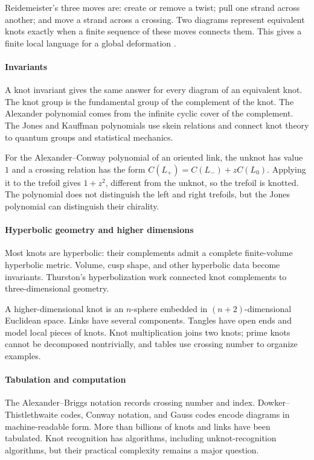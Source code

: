 Reidemeister's three moves are: create or remove a twist; pull one strand across another; and move a strand across a crossing. Two diagrams represent equivalent knots exactly when a finite sequence of these moves connects them. This gives a finite local language for a global deformation \cite{knot_theory_ref2}.

\paragraph{Invariants}
A knot invariant gives the same answer for every diagram of an equivalent knot. The knot group is the fundamental group of the complement of the knot. The Alexander polynomial comes from the infinite cyclic cover of the complement. The Jones and Kauffman polynomials use skein relations and connect knot theory to quantum groups and statistical mechanics.

For the Alexander--Conway polynomial of an oriented link, the unknot has value $1$ and a crossing relation has the form $C(L_+)=C(L_-)+zC(L_0)$. Applying it to the trefoil gives $1+z^2$, different from the unknot, so the trefoil is knotted. The polynomial does not distinguish the left and right trefoils, but the Jones polynomial can distinguish their chirality.

\paragraph{Hyperbolic geometry and higher dimensions}
Most knots are hyperbolic: their complements admit a complete finite-volume hyperbolic metric. Volume, cusp shape, and other hyperbolic data become invariants. Thurston's hyperbolization work connected knot complements to three-dimensional geometry.

A higher-dimensional knot is an $n$-sphere embedded in $(n+2)$-dimensional Euclidean space. Links have several components. Tangles have open ends and model local pieces of knots. Knot multiplication joins two knots; prime knots cannot be decomposed nontrivially, and tables use crossing number to organize examples.

\paragraph{Tabulation and computation}
The Alexander--Briggs notation records crossing number and index. Dowker--Thistlethwaite codes, Conway notation, and Gauss codes encode diagrams in machine-readable form. More than billions of knots and links have been tabulated. Knot recognition has algorithms, including unknot-recognition algorithms, but their practical complexity remains a major question.

